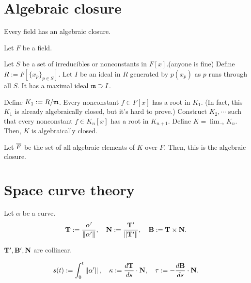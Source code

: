 \documentclass{article}
\let\realsection\section
\renewcommand\section{\newpage\realsection}
\begin{document}
\section{Algebraic closure}
\begin{thm}
Every field has an algebraic closure.
\end{thm}
\begin{pf}
Let $F$ be a field.

Let $S$ be a set of irreducibles or nonconstants in $F[x]$.(anyone is fine)
Define $R:=F[\{x_p\}_{p\in S}]$.
Let $I$ be an ideal in $R$ generated by $p(x_p)$ as $p$ runs through all $S$.
It has a maximal ideal $\mathfrak{m}\supset I$.

Define $K_1:=R/\mathfrak{m}$.
Every nonconstant $f\in F[x]$ has a root in $K_1$.
(In fact, this $K_1$ is already algebraically closed, but it's hard to prove.)
Construct $K_2,\cdots$ such that every nonconstant $f\in K_n[x]$ has a root in $K_{n+1}$.
Define $K=\lim_{\to}K_n$.
Then, $K$ is algebraically closed.

Let $\overline F$ be the set of all algebraic elements of $K$ over $F$.
Then, this is the algebraic closure.
\end{pf}




\section{Space curve theory}
\begin{defn}
Let $\alpha$ be a curve.
\[\mathbf{T}:=\frac{\alpha'}{\left\lVert\alpha'\right\rVert},\quad\mathbf{N}:=\frac{\mathbf{T}'}{\left\lVert\mathbf{T}'\right\rVert},\quad\mathbf{B}:=\mathbf{T}\times\mathbf{N}.\]
\end{defn}
\begin{prop}
$\mathbf{T}',\mathbf{B}',\mathbf{N}$ are collinear.
\end{prop}

\begin{defn}
\[s(t):=\int_0^t\norm{\alpha'},\quad\kappa:=\dd{\bT}{s}\cdot\bN,\quad\tau:=-\dd{\bB}{s}\cdot\bN.\]
\end{defn}
\end{document}
